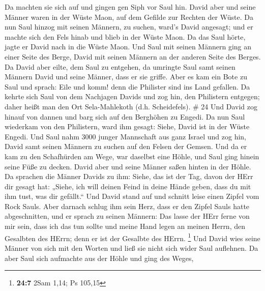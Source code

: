  Da machten sie sich auf und gingen gen Siph vor Saul hin.
David aber und seine Männer waren in der Wüste Maon, auf dem Gefilde zur
Rechten der Wüste.  Da nun Saul hinzog mit seinen Männern,
zu suchen, ward's David angesagt; und er machte sich den Fels hinab und
blieb in der Wüste Maon. Da das Saul hörte, jagte er David nach in die
Wüste Maon.  Und Saul mit seinen Männern ging an einer
Seite des Berge, David mit seinen Männern an der anderen Seite des
Berges. Da David aber eilte, dem Saul zu entgehen, da umringte Saul samt
seinen Männern David und seine Männer, dass er sie griffe. 
Aber es kam ein Bote zu Saul und sprach: Eile und komm! denn die
Philister sind ins Land gefallen.  Da kehrte sich Saul von
dem Nachjagen Davids und zog hin, den Philistern entgegen; daher heißt
man den Ort Sela-Mahlekoth (d.h. Scheidefels). \# 24  Und
David zog hinauf von dannen und barg sich auf den Berghöhen zu Engedi.
 Da nun Saul wiederkam von den Philistern, ward ihm gesagt:
Siehe, David ist in der Wüste Engedi.  Und Saul nahm 3000
junger Mannschaft aus ganz Israel und zog hin, David samt seinen Männern
zu suchen auf den Felsen der Gemsen.  Und da er kam zu den
Schafhürden am Wege, war daselbst eine Höhle, und Saul ging hinein seine
Füße zu decken. David aber und seine Männer saßen hinten in der Höhle.
 Da sprachen die Männer Davids zu ihm: Siehe, das ist der
Tag, davon der HErr dir gesagt hat: „Siehe, ich will deinen Feind in
deine Hände geben, dass du mit ihm tust, was dir gefällt.`` Und David
stand auf und schnitt leise einen Zipfel vom Rock Sauls. 
Aber darnach schlug ihm sein Herz, dass er den Zipfel Sauls hatte
abgeschnitten,  und er sprach zu seinen Männern: Das lasse
der HErr ferne von mir sein, dass ich das tun sollte und meine Hand
legen an meinen Herrn, den Gesalbten des HErrn; denn er ist der Gesalbte
des HErrn. \footnote{\textbf{24:7} 2Sam 1,14; Ps 105,15} 
Und David wies seine Männer von sich mit den Worten und ließ sie nicht
sich wider Saul auflehnen. Da aber Saul sich aufmachte aus der Höhle und
ging des Weges,

